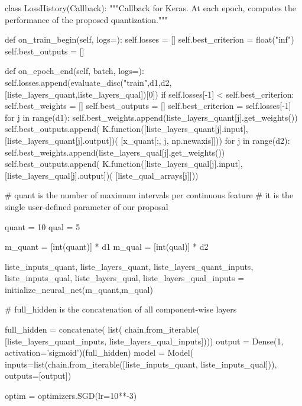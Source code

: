 \begin{pylisting}
    
    class LossHistory(Callback):
        """Callback for Keras. At each epoch, computes the performance of the proposed quantization."""

        def on_train_begin(self, logs={}):
            self.losses = []
            self.best_criterion = float("inf")
            self.best_outputs = []

        def on_epoch_end(self, batch, logs={}):
            self.losses.append(evaluate_disc("train",d1,d2,[liste_layers_quant,liste_layers_qual])[0])
            if self.losses[-1] < self.best_criterion:
                self.best_weights = []
                self.best_outputs = []
                self.best_criterion = self.losses[-1]
                for j in range(d1):
                    self.best_weights.append(liste_layers_quant[j].get_weights())
                    self.best_outputs.append(
                        K.function([liste_layers_quant[j].input],
                                   [liste_layers_quant[j].output])(
                                       [x_quant[:, j, np.newaxis]]))
                for j in range(d2):
                    self.best_weights.append(liste_layers_qual[j].get_weights())
                    self.best_outputs.append(
                        K.function([liste_layers_qual[j].input],
                                   [liste_layers_qual[j].output])(
                                       [liste_qual_arrays[j]]))
    
    
	# quant is the number of maximum intervals per continuous feature
	# it is the single user-defined parameter of our proposal    
    
    quant = 10
    qual = 5

    m_quant = [int(quant)] * d1
    m_qual = [int(qual)] * d2

	liste_inputs_quant, liste_layers_quant, liste_layers_quant_inputs, liste_inputs_qual, liste_layers_qual, liste_layers_qual_inputs = initialize_neural_net(m_quant,m_qual)

	# full_hidden is the concatenation of all component-wise layers
	
    full_hidden = concatenate(
        list(
          chain.from_iterable(
              [liste_layers_quant_inputs, liste_layers_qual_inputs])))
    output = Dense(1, activation='sigmoid')(full_hidden)
    model = Model(
      inputs=list(chain.from_iterable([liste_inputs_quant, liste_inputs_qual])),
      outputs=[output])  

    optim = optimizers.SGD(lr=10**-3)       
 

\end{pylisting}
